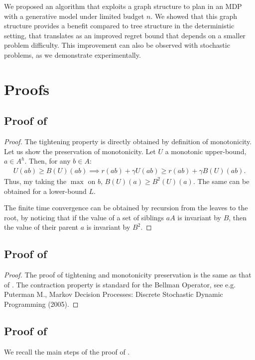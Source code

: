 \documentclass[runningheads]{llncs}
\begin{document}
We proposed an algorithm that exploits a graph structure to plan in an MDP with a generative model under limited budget $n$. We showed that this graph structure provides a benefit compared to tree structure in the deterministic setting, that translates as an improved regret bound that depends on a smaller problem difficulty. This improvement can also be observed with stochastic problems, as we demonstrate experimentally.

\FloatBarrier


\clearpage
\appendix

\section{Proofs}

\subsection{Proof of }
\begin{proof}
The tightening property is directly obtained by definition of monotonicity.
Let us show the preservation of monotonicity. Let $U$ a monotonic upper-bound, $a\in A^h$. Then, for any $b\in A$:
\begin{align*}
U(ab) \geq B(U)(ab) \implies 
r(ab) + \gamma U(ab) \geq r(ab) + \gamma B(U)(ab).
\end{align*}
Thus, my taking the $\max$ on $b$,
$
B(U)(a) \geq B^2(U)(a).
$
The same can be obtained for a lower-bound $L$.

The finite time convergence can be obtained by recursion from the leaves to the root, by noticing that if the value of a set of siblings $aA$ is invariant by $B$, then the value of their parent $a$ is invariant by $B^2$.
\end{proof}

\subsection{Proof of }
\begin{proof}
The proof of tightening and monotonicity preservation is the same as that of .
The contraction property is standard for the Bellman Operator, see e.g. Puterman M., Markov Decision Processes: Discrete Stochastic Dynamic Programming (2005).
\end{proof}

\subsection{Proof of }
We recall the main steps of the proof of \citet{Hren2008optimistic}.\\
\end{document}
